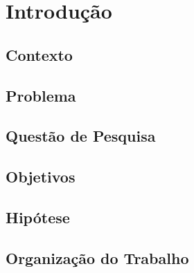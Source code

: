 \chapter{Introdução}

\section {Contexto}
\section{Problema}
\section{Questão de Pesquisa}
\section{Objetivos}
\section{Hipótese}
\section{Organização do Trabalho}

